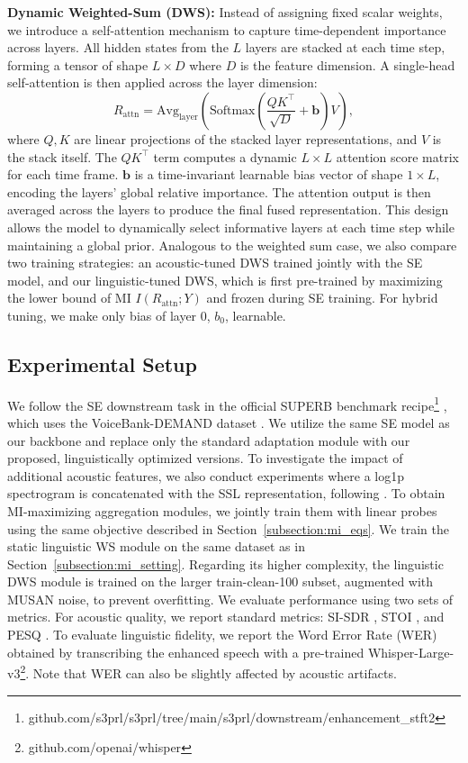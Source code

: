 \documentclass{article}
\begin{document}
\textbf{Dynamic Weighted-Sum (DWS):} Instead of assigning fixed scalar weights, we introduce a self-attention mechanism to capture time-dependent importance across layers. All hidden states from the $L$ layers are stacked at each time step, forming a tensor of shape $L\times D$ where $D$ is the feature dimension. A single-head self-attention is then applied across the layer dimension:
\begin{equation}
    R_{\mathrm{attn}} = \mathrm{Avg}_{\text{layer}}\!\left(\mathrm{Softmax}\!\left(\frac{QK^\top}{\sqrt{D}} + \mathbf{b}\right)V\right),
\end{equation}
where $Q,K$ are linear projections of the stacked layer representations, and $V$ is the stack itself. The $QK^\top$ term computes a dynamic $L\times L$ attention score matrix for each time frame. $\mathbf{b}$ is a time-invariant learnable bias vector of shape $1\times L$, encoding the layers' global relative importance. The attention output is then averaged across the layers to produce the final fused representation. This design allows the model to dynamically select informative layers at each time step while maintaining a global prior. Analogous to the weighted sum case, we also compare two training strategies: an acoustic-tuned DWS trained jointly with the SE model, and our linguistic-tuned DWS, which is first pre-trained by maximizing the lower bound of MI $I(R_{\mathrm{attn}}; Y)$ and frozen during SE training. For hybrid tuning, we make only bias of layer 0, $b_0$, learnable.

\label{sec:exp}
\subsection{Experimental Setup}
We follow the SE downstream task in the official SUPERB benchmark recipe\footnote{github.com/s3prl/s3prl/tree/main/s3prl/downstream/enhancement\_stft2} \cite{superb, superb-sg}, which uses the VoiceBank-DEMAND dataset \cite{vbd}. We utilize the same SE model as our backbone and replace only the standard adaptation module with our proposed, linguistically optimized versions. To investigate the impact of additional acoustic features, we also conduct experiments where a log1p spectrogram is concatenated with the SSL representation, following \cite{wsum_acoustic_se}. To obtain MI-maximizing aggregation modules, we jointly train them with linear probes using the same objective described in Section~\ref{subsection:mi_eqs}. We train the static linguistic WS module on the same dataset as in Section~\ref{subsection:mi_setting}. Regarding its higher complexity, the linguistic DWS module is trained on the larger train-clean-100 subset, augmented with MUSAN noise, to prevent overfitting.
We evaluate performance using two sets of metrics. For acoustic quality, we report standard metrics: SI-SDR \cite{sisdr}, STOI \cite{estoi}, and PESQ \cite{pesq}. To evaluate linguistic fidelity, we report the Word Error Rate (WER) obtained by transcribing the enhanced speech with a pre-trained Whisper-Large-v3\footnote{github.com/openai/whisper}. 
Note that WER can also be slightly affected by acoustic artifacts.
\end{document}
